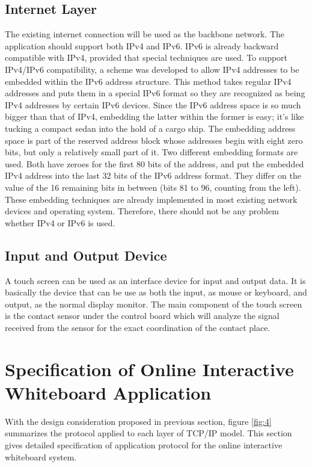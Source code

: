 \documentclass[conference]{IEEEtran}
\begin{document}
\subsection{Internet Layer}
The existing internet connection will be used as the backbone network. The application should support both IPv4 and IPv6. IPv6 is already backward compatible with IPv4, provided that special techniques are used. To support IPv4/IPv6 compatibility, a scheme was developed to allow IPv4 addresses to be embedded within the IPv6 address structure. This method takes regular IPv4 addresses and puts them in a special IPv6 format so they are recognized as being IPv4 addresses by certain IPv6 devices.
Since the IPv6 address space is so much bigger than that of IPv4, embedding the latter within the former is easy; it's like tucking a compact sedan into the hold of a cargo ship. The embedding address space is part of the reserved address block whose addresses begin with eight zero bits, but only a relatively small part of it. Two different embedding formats are used. Both have zeroes for the first 80 bits of the address, and put the embedded IPv4 address into the last 32 bits of the IPv6 address format. They differ on the value of the 16 remaining bits in between (bits 81 to 96, counting from the left). These embedding techniques are already implemented in most existing network devices and operating system. Therefore, there should not be any problem whether IPv4 or IPv6 is used.

\subsection{Input and Output Device}
A touch screen can be used as an interface device for input and output data. It is basically the device that can be use as both the input, as mouse or keyboard, and output, as the normal display monitor. The main component of the touch screen is the contact sensor under the control board which will analyze the signal received from the sensor for the exact coordination of the contact place. 

\section{Specification of Online Interactive Whiteboard Application}
With the design consideration proposed in previous section, figure \ref{fig:4} summarizes the protocol applied to each layer of TCP/IP model. This section gives detailed specification of application protocol for the online interactive whiteboard system.
 
\end{document}
